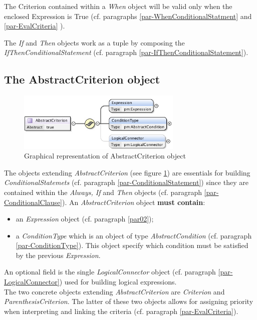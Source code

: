 \documentclass[a4paper,11pt] {ivoa}
\begin{document}
The Criterion contained within a {\it When} object will be valid only when the enclosed Expression
is True (cf. paragraphs \ref{par-WhenConditionalStatment} and \ref{par-EvalCriteria} ).

The {\it If} and {\it Then} objects work as a tuple by composing the  {\it
IfThenConditionalStatement} (cf. paragraph
\ref{par-IfThenConditionalStatement}).

\subsection{The AbstractCriterion object}\label{par-AbstractCriterion}
\begin{figure}[htbp]
\begin{center}
\includegraphics[width=0.7\textwidth]{pictures/AbstractCriterion.jpg} 
\caption{Graphical representation of AbstractCriterion object}
\label{Pic-AbstractCriterion}
\end{center}
\end{figure}
The objects extending {\it AbstractCriterion} (see figure \ref{Pic-AbstractCriterion}) are
essentials for building {\it ConditionalStatemets} (cf. paragraph \ref{par-ConditionalStatement})
since they are contained within the {\it Always, If} and {\it Then} objects (cf. paragraph
\ref{par-ConditionalClause}).
An {\it AbstractCriterion} object {\bf must contain}:
\begin{itemize}
\item an {\it Expression} object (cf. paragraph \ref{par02});
\item a {\it ConditionType} which is an object of type {\it AbstractCondition} (cf. paragraph 
\ref{par-ConditionType}).
This object specify which condition must be satisfied by the previous {\it Expression}.
\end{itemize}
An optional field is the single {\it LogicalConnector} object (cf. paragraph
\ref{par-LogicalConnector}) used for building logical expressions.\\
The two concrete objects extending  {\it AbstractCriterion}  are {\it Criterion} and {\it
ParenthesisCriterion}.  The latter of these two objects allows for assigning priority when
interpreting and linking the criteria (cf. paragraph \ref{par-EvalCriteria}).
\end{document}
